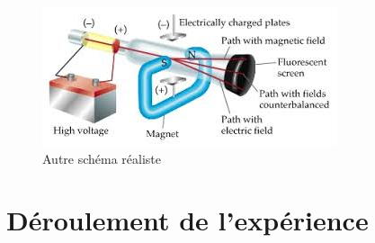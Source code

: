 \documentclass[../main.tex]{subfiles}
\begin{document}
\begin{figure}[h!]
    \centering
    \includegraphics[scale=0.9]{images/08.JJ-Thomson..jpg}
    \caption{Autre schéma réaliste}
    \label{fig:my_label}
\end{figure}

\section{Déroulement de l'expérience}
\end{document}
